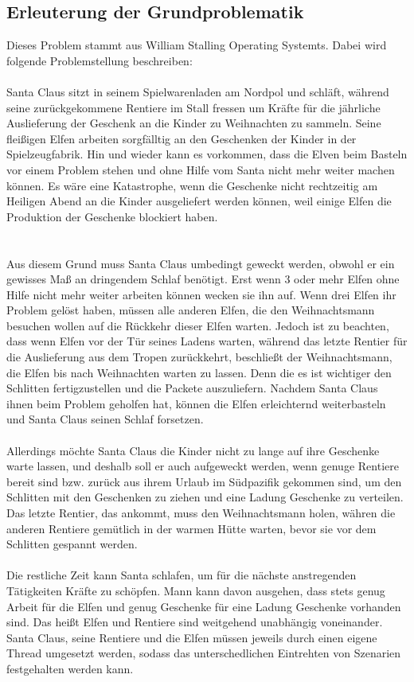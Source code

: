\documentclass[a4paper,12pt]{article}
\begin{document}
\subsection{Erleuterung der Grundproblematik}
Dieses Problem stammt aus William Stalling Operating Systemts. Dabei wird folgende Problemstellung beschreiben:\\ 
\\Santa Claus sitzt in seinem Spielwarenladen am Nordpol und schläft, während seine zurückgekommene Rentiere im Stall fressen
um Kräfte für die jährliche Auslieferung der Geschenk an die Kinder zu Weihnachten zu sammeln. Seine fleißigen Elfen arbeiten sorgfälltig an den Geschenken der Kinder
in der Spielzeugfabrik. Hin und wieder kann es vorkommen, dass die Elven beim Basteln vor einem Problem stehen und ohne Hilfe vom Santa nicht mehr weiter machen können.
Es wäre eine Katastrophe, wenn die Geschenke nicht rechtzeitig am Heiligen Abend an die Kinder ausgeliefert werden können, weil einige Elfen die Produktion der Geschenke blockiert haben. \\\\
\\Aus diesem Grund muss Santa Claus umbedingt geweckt werden, obwohl er ein gewisses Maß an dringendem Schlaf benötigt. Erst wenn 3 oder mehr Elfen ohne Hilfe nicht mehr weiter arbeiten können wecken sie ihn auf.
Wenn drei Elfen ihr Problem gelöst haben, müssen alle anderen Elfen, die den Weihnachtsmann besuchen wollen auf die Rückkehr dieser Elfen warten.
Jedoch ist zu beachten, dass wenn Elfen vor der Tür seines Ladens warten, während das letzte Rentier für die Auslieferung aus dem Tropen zurückkehrt, beschließt der Weihnachtsmann, die Elfen bis nach Weihnachten warten zu lassen. Denn die es ist wichtiger den Schlitten
fertigzustellen und die Packete auszuliefern.
Nachdem Santa Claus ihnen beim Problem geholfen hat, können die Elfen erleichternd weiterbasteln und Santa Claus seinen Schlaf forsetzen.\\
\\Allerdings möchte Santa Claus die Kinder nicht zu lange auf ihre Geschenke warte lassen, und deshalb soll er auch aufgeweckt werden, wenn genuge Rentiere bereit sind bzw. zurück aus ihrem Urlaub im Südpazifik gekommen sind, um den 
Schlitten mit den Geschenken zu ziehen und eine Ladung Geschenke zu verteilen. Das letzte Rentier, das ankommt, muss den Weihnachtsmann holen, währen die anderen Rentiere gemütlich in der warmen Hütte warten, bevor sie vor dem Schlitten gespannt werden.\\
\\Die restliche Zeit kann Santa schlafen, um für die nächste anstregenden Tätigkeiten Kräfte zu schöpfen. Mann kann davon ausgehen, dass stets genug Arbeit für die Elfen und genug Geschenke für eine Ladung Geschenke vorhanden sind.
Das heißt Elfen und Rentiere sind weitgehend unabhängig voneinander. Santa Claus, seine Rentiere und die Elfen müssen jeweils durch einen eigene Thread umgesetzt werden, sodass das unterschedlichen Eintrehten von Szenarien festgehalten werden kann.
\end{document}
